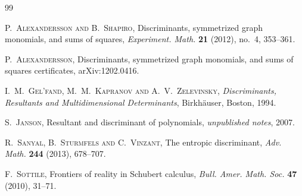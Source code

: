 \documentclass[11pt]{amsart}
\numberwithin{equation}{section}
\begin{document}
\begin{thebibliography}{99}

\textsc{P.~Alexandersson and B.~Shapiro},
Discriminants, symmetrized graph monomials, and sums of squares,
\emph{Experiment. Math.} \textbf{21} (2012), no.~4, 353--361.

\textsc{P.~Alexandersson},
Discriminants, symmetrized graph monomials, and sums of squares certificates,
arXiv:1202.0416.

\textsc{I.~M.~Gel'fand, M.~M.~Kapranov and A.~V.~Zelevinsky},
\emph{Discriminants, Resultants and Multidimensional Determinants},
Birkh\"auser, Boston, 1994.

\textsc{S.~Janson},
Resultant and discriminant of polynomials,
\emph{unpublished notes}, 2007.

\textsc{R.~Sanyal, B.~Sturmfels and C.~Vinzant},
The entropic discriminant,
\emph{Adv. Math.} \textbf{244} (2013), 678--707.

\textsc{F.~Sottile},
Frontiers of reality in Schubert calculus,
\emph{Bull. Amer. Math. Soc.} \textbf{47} (2010), 31--71.

\end{thebibliography}
\end{document}
